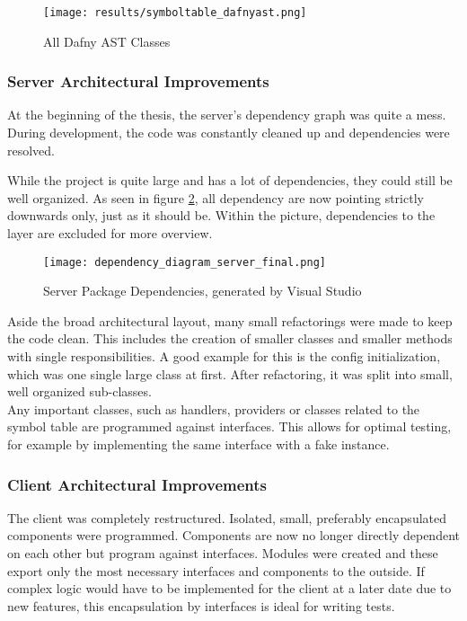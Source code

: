 \begin{figure}[H]
    \centering
    \texttt{[image: results/symboltable\_dafnyast.png]}
    \caption{All Dafny AST Classes}
    \label{fig:dafnyASTOverview_3}
\end{figure}

\subsubsection{Server Architectural Improvements}
At the beginning of the thesis, the server's dependency graph was quite a mess.
During development, the code was constantly cleaned up and dependencies were resolved.

While the project is quite large and has a lot of dependencies, they could still be well organized.
As seen in figure \ref{fig:dependency_graph_2}, all dependency are now pointing strictly downwards only, just as it should be.
Within the picture, dependencies to the  layer are excluded for more overview.
\begin{figure}[H]
    \centering
    \texttt{[image: dependency\_diagram\_server\_final.png]}
    \caption{Server Package Dependencies, generated by Visual Studio}
    \label{fig:dependency_graph_2}
\end{figure}

Aside the broad architectural layout, many small refactorings were made to keep the code clean.
This includes the creation of smaller classes and smaller methods with single responsibilities.
A good example for this is the config initialization, which was one single large class at first.
After refactoring, it was split into small, well organized sub-classes.\\

Any important classes, such as handlers, providers or classes related to the symbol table are programmed against interfaces.
This allows for optimal testing, for example by implementing the same interface with a fake instance.

\subsubsection{Client Architectural Improvements}
The client was completely restructured.
Isolated, small, preferably encapsulated components were programmed.
Components are now no longer directly dependent on each other but program against interfaces.
Modules were created and these export only the most necessary interfaces and components to the outside.
If complex logic would have to be implemented for the client at a later date due to new features,
this encapsulation by interfaces is ideal for writing tests. \\

